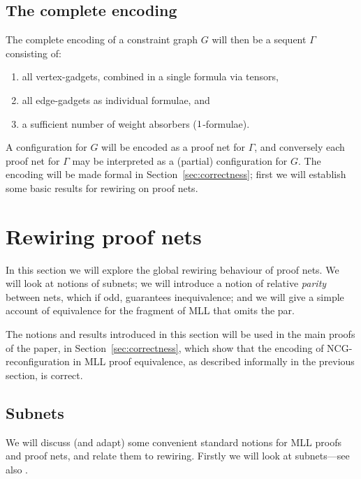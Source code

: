 \documentclass{lmcs}
\let\capsabbrev=\uppercase
\begin{document}
\subsection*{The complete encoding}

The complete encoding of a constraint graph $G$ will then be a sequent $\Gamma$ consisting of:
%
\begin{enumerate}
 	\item
all vertex-gadgets, combined in a single formula via tensors, 
	\item
all edge-gadgets as individual formulae, and
	\item
a sufficient number of weight absorbers ($1$-formulae).
\end{enumerate}
%
A configuration for $G$ will be encoded as a proof net for $\Gamma$, and conversely each proof net for $\Gamma$ may be interpreted as a (partial) configuration for $G$. The encoding will be made formal in Section~\ref{sec:correctness}; first we will establish some basic results for rewiring on proof nets.






\section{Rewiring proof nets}
\label{sec:rewiring}


In this section we will explore the global rewiring behaviour of proof nets. We will look at notions of subnets; we will introduce a notion of relative \emph{parity} between nets, which if odd, guarantees inequivalence; and we will give a simple account of equivalence for the fragment of \capsabbrev{mll} that omits the par.

The notions and results introduced in this section will be used in the main proofs of the paper, in Section~\ref{sec:correctness}, which show that the encoding of \capsabbrev{ncg}-reconfiguration in \capsabbrev{mll} proof equivalence, as described informally in the previous section, is correct.



\subsection*{Subnets}


We will discuss (and adapt) some convenient standard notions for \capsabbrev{mll} proofs and proof nets, and relate them to rewiring. Firstly we will look at subnets---see also \cite{Bellin-vandeWiele-1995}.
\end{document}
